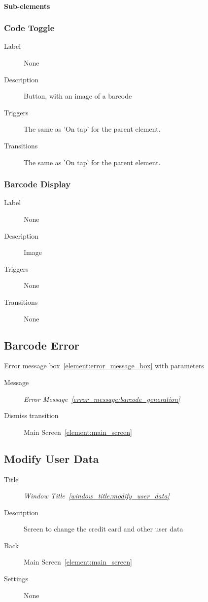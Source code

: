 \documentclass[a4paper,10pt]{article}
\newcommand{\windowTitleLabelText}{Window Title}
\newcommand{\windowTitleLabel}{window_title:}
\DeclareRobustCommand{\windowTitleRef}[1]{%
   \emph{\windowTitleLabelText~\ref{\windowTitleLabel#1}}}
\newcommand{\errorMessageLabelText}{Error Message}
\newcommand{\errorMessageLabel}{error_message:}
\DeclareRobustCommand{\errorMessageTextRef}[1]{%
   \emph{\errorMessageLabelText~\ref{\errorMessageLabel#1}}}
\newcommand{\elementLabel}{element:}
\DeclareRobustCommand{\element}[2]{\subsection{#1}\label{\elementLabel#2}}
\DeclareRobustCommand{\elementRef}[1]{\ref{\elementLabel#1}}
\begin{document}
\paragraph{Sub-elements}

\subsubsection{Code Toggle}
\begin{description}
 \item[Label] None
 \item[Description] Button, with an image of a barcode
 \item[Triggers] The same as 'On tap' for the parent element.
 \item[Transitions] The same as 'On tap' for the parent element.
\end{description}

\subsubsection{Barcode Display}
\begin{description}
 \item[Label] None
 \item[Description] Image
 \item[Triggers] None
 \item[Transitions] None
\end{description}

\element{Barcode Error}{barcode_error}

Error message box~\elementRef{error_message_box} with parameters
\begin{description}
 \item[Message] \errorMessageTextRef{barcode_generation}
 \item[Dismiss transition] Main Screen~\elementRef{main_screen}
\end{description}

\element{Modify User Data}{modify_user_data}

\begin{description}
 \item[Title] \windowTitleRef{modify_user_data}
 \item[Description] Screen to change the credit card and other user 
data
 \item[Back] Main Screen~\elementRef{main_screen}
 \item[Settings] None
\end{description}
\end{document}
